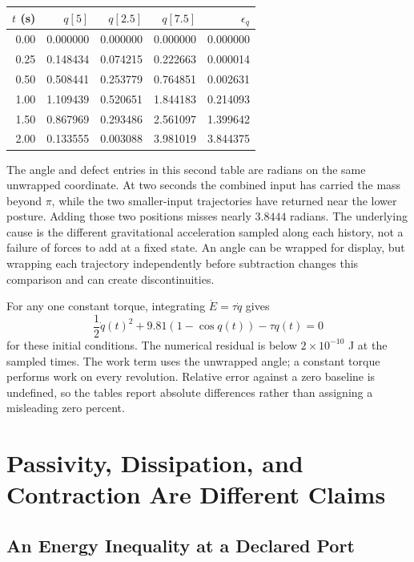\begin{center}
\small
\begin{tabular}{rrrrr}
\toprule
$t$ (s) & $q[5]$ & $q[2.5]$ & $q[7.5]$ & $\epsilon_q$ \\
\midrule
0.00 & 0.000000 & 0.000000 & 0.000000 & 0.000000 \\
0.25 & 0.148434 & 0.074215 & 0.222663 & 0.000014 \\
0.50 & 0.508441 & 0.253779 & 0.764851 & 0.002631 \\
1.00 & 1.109439 & 0.520651 & 1.844183 & 0.214093 \\
1.50 & 0.867969 & 0.293486 & 2.561097 & 1.399642 \\
2.00 & 0.133555 & 0.003088 & 3.981019 & 3.844375 \\
\bottomrule
\end{tabular}
\end{center}

The angle and defect entries in this second table are radians on the same unwrapped coordinate. At two seconds the combined input has carried the mass beyond $\pi$, while the two smaller-input trajectories have returned near the lower posture. Adding those two positions misses nearly $3.8444$ radians. The underlying cause is the different gravitational acceleration sampled along each history, not a failure of forces to add at a fixed state. An angle can be wrapped for display, but wrapping each trajectory independently before subtraction changes this comparison and can create discontinuities.

For any one constant torque, integrating $\dot E=\tau\dot q$ gives
\begin{equation}
\frac12\dot q(t)^2+9.81(1-\cos q(t))-\tau q(t)=0
\end{equation}
for these initial conditions. The numerical residual is below $2\times10^{-10}$ J at the sampled times. The work term uses the unwrapped angle; a constant torque performs work on every revolution. Relative error against a zero baseline is undefined, so the tables report absolute differences rather than assigning a misleading zero percent.

\section{Passivity, Dissipation, and Contraction Are Different Claims}

\subsection{An Energy Inequality at a Declared Port}

